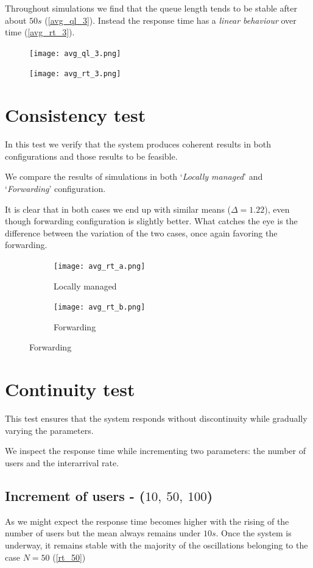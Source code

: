 \documentclass{report}
\begin{document}
Throughout simulations we find that the queue length tends to be stable after about $50s$ (\autoref{avg_ql_3}). Instead the response time has a \textit{linear behaviour} over time (\autoref{avg_rt_3}).

\begin{figure}[H]
    \centering
    \texttt{[image: avg\_ql\_3.png]}
    \caption{}
    \label{avg_ql_3}
\end{figure}
\begin{figure}[H]
    \centering
    \texttt{[image: avg\_rt\_3.png]}
    \caption{}
    \label{avg_rt_3}
\end{figure}

\section{Consistency test}
In this test we verify that the system produces coherent results in both configurations and those results to be feasible.

We compare the results of simulations in both `\textit{Locally managed}' and `\textit{Forwarding}' configuration.

It is clear that in both cases we end up with similar means ($\Delta=1.22$), even though forwarding configuration is slightly better. What catches the eye is the difference between the variation of the two cases, once again favoring the forwarding.

\begin{figure}[H]
    \begin{subfigure}{0.60\textwidth}
        \centering
        \texttt{[image: avg\_rt\_a.png]}
        \caption{Locally managed}
    \end{subfigure}
    \begin{subfigure}{0.60\textwidth}
        \centering
        \texttt{[image: avg\_rt\_b.png]}
        \caption{Forwarding}
    \end{subfigure}
\end{figure}

\section{Continuity test}
This test ensures that the system responds without discontinuity while gradually varying the parameters.

We inspect the response time while incrementing two parameters: the number of users and the interarrival rate.

\subsection{Increment of users - ($10, \ 50, \ 100$)}\label{nusers}
As we might expect the response time becomes higher with the rising of the number of users but the mean always remains under $10s$. Once the system is underway, it remains stable with the majority of the oscillations belonging to the case $N=50$ (\autoref{rt_50})
\end{document}
